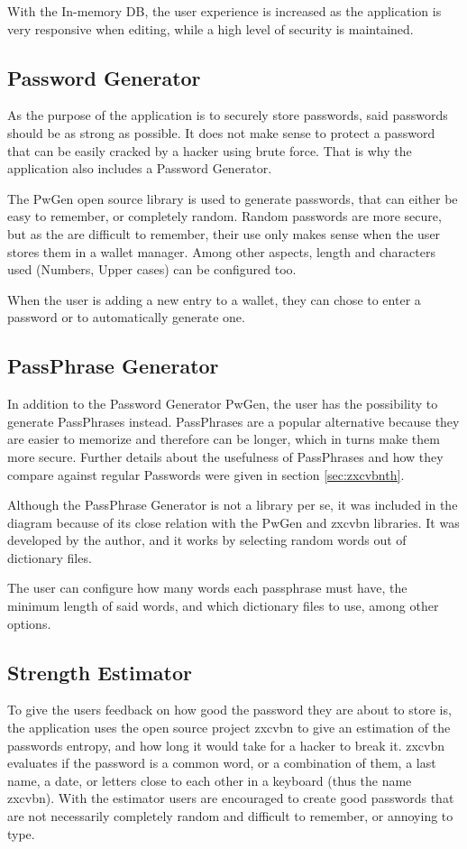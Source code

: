 With the In-memory DB, the user experience is increased as the application is very responsive when editing, while a high level of security is maintained.

\subsection{Password Generator}
As the purpose of the application is to securely store passwords, said passwords should be as strong as possible. It does not make sense to protect a password that can be easily cracked by a hacker using brute force. That is why the application also includes a Password Generator.

The PwGen \cite{pwgen} open source library is used to generate passwords, that can either be easy to remember, or completely random. Random passwords are more secure, but as the are difficult to remember, their use only makes sense when the user stores them in a wallet manager. Among other aspects, length and characters used (Numbers, Upper cases) can be configured too.

When the user is adding a new entry to a wallet, they can chose to enter a password or to automatically generate one.

\subsection{PassPhrase Generator}
In addition to the Password Generator PwGen, the user has the possibility to generate PassPhrases instead. PassPhrases are a popular alternative because they are easier to memorize and therefore can be longer, which in turns make them more secure. Further details about the usefulness of PassPhrases and how they compare against regular Passwords were given in section \ref{sec:zxcvbnth}.

Although the PassPhrase Generator is not a library per se, it was included in the diagram because of its close relation with the PwGen and zxcvbn libraries. It was developed by the author, and it works by selecting random words out of dictionary files. 

The user can configure how many words each passphrase must have, the minimum length of said words, and which dictionary files to use, among other options.

\subsection{Strength Estimator}
To give the users feedback on how good the password they are about to store is, the application uses the open source project zxcvbn to give an estimation of the passwords entropy, and how long it would take for a hacker to break it. zxcvbn evaluates if the password is a common word, or a combination of them, a last name, a date, or letters close to each other in a keyboard (thus the name zxcvbn). With the estimator users are encouraged to create good passwords that are not necessarily completely random and difficult to remember, or annoying to type.


